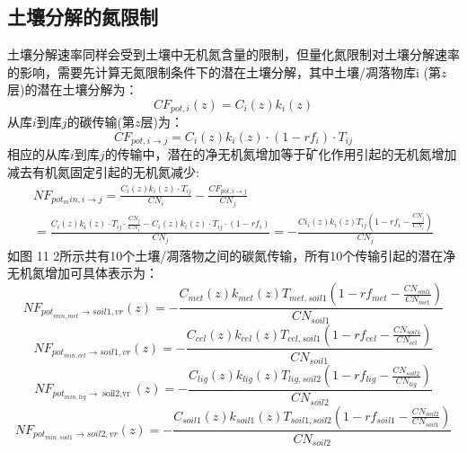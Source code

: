 \subsection{土壤分解的氮限制}\label{土壤分解的氮限制}
土壤分解速率同样会受到土壤中无机氮含量的限制，但量化氮限制对土壤分解速率的影响，需要先计算无氮限制条件下的潜在土壤分解，其中土壤/凋落物库i (第$z$层)的潜在土壤分解为：
\begin{equation}
C F_{pot, i}(z)=C_{i}(z) k_{i}(z)
\end{equation}
从库$i$到库$j$的碳传输(第$z$层)为：
\begin{equation}
C F_{pot, i \rightarrow j}=C_{i}(z) k_{i}(z) \cdot\left(1-r f_{i}\right) \cdot T_{i j}
\end{equation}
相应的从库$i$到库$j$的传输中，潜在的净无机氮增加等于矿化作用引起的无机氮增加减去有机氮固定引起的无机氮减少:
\begin{equation}
\begin{array}{l}N F_{pot_{m} i n, i \rightarrow j}=\frac{C_{i}(z) k_{i}(z) \cdot T_{i j}}{C N_{i}}-\frac{C F_{pot, i \rightarrow j}}{C N_{j}} \\
     =\frac{C_{i}(z) k_{i}(z) \cdot T_{i j} \cdot \frac{C N_{j}}{C N_{i}}-C_{i}(z) k_{i}(z) \cdot T_{i j} \cdot\left(1-r f_{i}\right)}{C N_{j}}=
     -\frac{C i_{i}(z) k_{i}(z) T_{i j}\left(1-r f_{i}-\frac{C N_{j}}{C N_{i}}\right)}{C N_{j}}\end{array}
\end{equation}
如图 11 2所示共有10个土壤/凋落物之间的碳氮传输，所有10个传输引起的潜在净无机氮增加可具体表示为：
\begin{equation}\label{NF_pot_minmet}
    N F_{{pot}_{min,met} \rightarrow {soil1,vr}}(z)=-\frac{C_{{met}}(z) k_{{met}}(z) T_{met, soil1}\left(1-r f_{met}-\frac{C N_{{soil1 }}}{C N_{met}}\right)}{C N_{{soil1 }}}
\end{equation}
\begin{equation}
N F_{pot_{min,cel} \rightarrow { soil1,vr }}(z)=-\frac{C_{cel}(z) k_{cel}(z) T_{cel, soil1}\left(1-r f_{cel}-\frac{C N_{{soil 1}}}{C N_{cel}}\right)}{C N_{{soil1}}}
\end{equation}
\begin{equation}
N F_{pot_{min,lig} \rightarrow \operatorname{soil2,vr}}(z)=-\frac{C_{lig}(z) k_{lig}(z) T_{lig, soil2}\left(1-r f_{lig}-\frac{C N_{{soil2 }}}{C N_{lig}}\right)}{C N_{{soil2 }}}
\end{equation}
\begin{equation}
NF_{pot_{min,soil1}\rightarrow soil2,vr}\left(z\right)=-\frac{C_{soil1}\left(z\right)k_{soil1}\left(z\right)T_{soil1,soil2}\left(1-rf_{soil1}-\frac{CN_{soil2}}{CN_{soil1}}\right)}{CN_{soil2}}
\end{equation}
